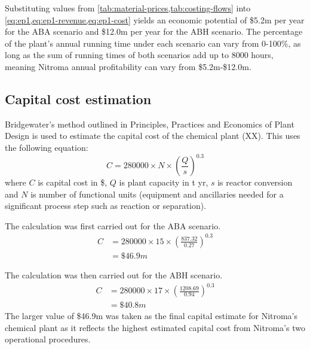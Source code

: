 Substituting values from \cref{tab:material-prices,tab:costing-flows} into \cref{eq:ep1,eq:ep1-revenue,eq:ep1-cost} yields an economic potential of \$5.2m per year for the ABA scenario and \$12.0m per year for the ABH scenario. The percentage of the plant's annual running time under each scenario can vary from 0-100\%, as long as the sum of running times of both scenarios add up to 8000 hours, meaning Nitroma annual profitability can vary from \$5.2m-\$12.0m.

\subsection{Capital cost estimation}

Bridgewater's method outlined in Principles, Practices and Economics of Plant Design is used to estimate the capital cost of the chemical plant (XX). This uses the following equation:
\begin{equation}
    C= \num{280000} \times N \times \left(\frac{Q}{s}\right)^{0.3}
\end{equation}
where $C$ is capital cost in \$, $Q$ is  plant capacity in t yr, $s$ is reactor conversion and $N$ is number of functional units (equipment and ancillaries needed for a significant process step such as reaction or separation).

The calculation was first carried out for the ABA scenario.
\begin{align*}
C &= \num{280000} \times 15 \times \left(\frac{837.32}{0.27}\right)^{0.3}  \\
  &= \$46.9m 
\end{align*}

The calculation was then carried out for the ABH scenario.
\begin{align*}
C &= 280000 \times 17 \times \left(\frac{1208.69}{0.94}\right)^{0.3}  \\
  &=\$40.8m 
\end{align*}
The larger value of \$46.9m was taken as the final capital estimate for Nitroma's chemical plant as it reflects the highest estimated capital cost from Nitroma's two operational procedures.